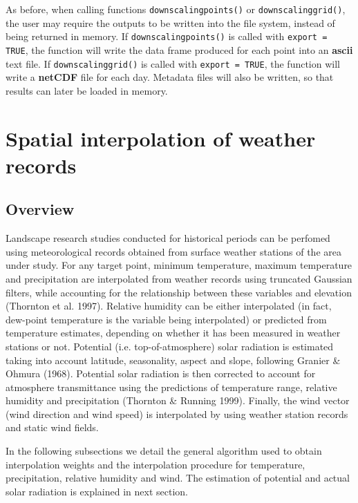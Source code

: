 \documentclass[11pt,a4paper]{article}
\begin{document}
As before, when calling functions \texttt{downscalingpoints()} or \texttt{downscalinggrid()}, the user may require the outputs to be written into the file system, instead of being returned in memory. If \texttt{downscalingpoints()} is called with \texttt{export = TRUE}, the function will write the data frame produced for each point into an \textbf{ascii} text file. If \texttt{downscalinggrid()} is called with \texttt{export = TRUE}, the function will write a \textbf{netCDF} file for each day. Metadata files will also be written, so that results can later be loaded in memory.


\section{Spatial interpolation of weather records}
\subsection{Overview}
Landscape research studies conducted for historical periods can be perfomed using meteorological records obtained from surface weather stations of the area under study. For any target point, minimum temperature, maximum temperature and precipitation are interpolated from weather records using truncated Gaussian filters, while accounting for the relationship between these variables and elevation (Thornton et al. 1997). Relative humidity can be either interpolated (in fact, dew-point temperature is the variable being interpolated) or predicted from temperature estimates, depending on whether it has been measured in weather stations or not. Potential (i.e. top-of-atmosphere) solar radiation is estimated taking into account latitude, seasonality, aspect and slope, following Granier \& Ohmura (1968). Potential solar radiation is then corrected to account for atmosphere transmittance using the predictions of temperature range, relative humidity and precipitation (Thornton \& Running 1999). Finally, the wind vector (wind direction and wind speed) is interpolated by using weather station records and static wind fields. 

In the following subsections we detail the general algorithm used to obtain interpolation weights and the interpolation procedure for temperature, precipitation, relative humidity and wind. The estimation of potential and actual solar radiation is explained in next section.
\end{document}
